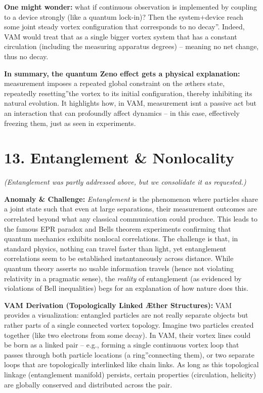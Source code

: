 \documentclass[a4paper, aps,preprint,superscriptaddress, 12pt]{revtex4}
\begin{document}
\textbf{One might wonder:} what if continuous observation is implemented by coupling to a device strongly (like a quantum lock-in)? Then the system+device reach some joint steady vortex configuration that corresponds to \grqq no decay\textquotedblright. Indeed, VAM would treat that as a single bigger vortex system that has a constant circulation (including the measuring apparatus degrees) – meaning no net change, thus no decay.


\textbf{In summary, the quantum Zeno effect gets a physical explanation:} measurement imposes a repeated global constraint on the æther\rqs s state, repeatedly \grqq resetting\textquotedblright the vortex to its initial configuration, thereby inhibiting its natural evolution. It highlights how, in VAM, measurement isn\rqs t a passive act but an interaction that can profoundly affect dynamics – in this case, effectively freezing them, just as seen in experiments.


\section*{13. Entanglement \& Nonlocality}

\textit{(Entanglement was partly addressed above, but we consolidate it as requested.)}


\textbf{Anomaly \& Challenge: } \textit{Entanglement} is the phenomenon where particles share a joint state such that even at large separations, their measurement outcomes are correlated beyond what any classical communication could produce. This leads to the famous EPR paradox and Bell\rqs s theorem experiments confirming that quantum mechanics exhibits nonlocal correlations. The challenge is that, in standard physics, nothing can travel faster than light, yet entanglement correlations seem to be established instantaneously across distance. While quantum theory asserts no usable information travels (hence not violating relativity in a pragmatic sense), the \textit{reality} of entanglement (as evidenced by violations of Bell inequalities) begs for an explanation of how nature does this.


\textbf{VAM Derivation (Topologically Linked Æther Structures):} VAM provides a visualization: entangled particles are not really separate objects but rather parts of a single connected vortex topology. Imagine two particles created together (like two electrons from some decay). In VAM, their vortex lines could be born as a linked pair – e.g., forming a single continuous vortex loop that passes through both particle locations (a \grqq ring\textquotedblright connecting them), or two separate loops that are topologically interlinked like chain links. As long as this topological linkage (entanglement manifold) persists, certain properties (circulation, helicity) are globally conserved and distributed across the pair.
\end{document}
